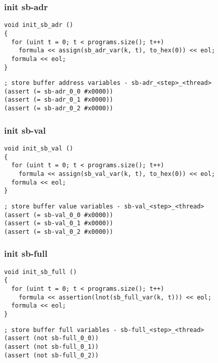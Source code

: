 \subsubsection{init sb-adr}

\begin{lstlisting}[style=c++]
void init_sb_adr ()
{
  for (uint t = 0; t < programs.size(); t++)
    formula << assign(sb_adr_var(k, t), to_hex(0)) << eol;
  formula << eol;
}
\end{lstlisting}

\begin{lstlisting}[language=SMTLib]
; store buffer address variables - sb-adr_<step>_<thread>
(assert (= sb-adr_0_0 #x0000))
(assert (= sb-adr_0_1 #x0000))
(assert (= sb-adr_0_2 #x0000))
\end{lstlisting}

\subsubsection{init sb-val}

\begin{lstlisting}[style=c++]
void init_sb_val ()
{
  for (uint t = 0; t < programs.size(); t++)
    formula << assign(sb_val_var(k, t), to_hex(0)) << eol;
  formula << eol;
}
\end{lstlisting}

\begin{lstlisting}[language=SMTLib]
; store buffer value variables - sb-val_<step>_<thread>
(assert (= sb-val_0_0 #x0000))
(assert (= sb-val_0_1 #x0000))
(assert (= sb-val_0_2 #x0000))
\end{lstlisting}

\subsubsection{init sb-full}

\begin{lstlisting}[style=c++]
void init_sb_full ()
{
  for (uint t = 0; t < programs.size(); t++)
    formula << assertion(lnot(sb_full_var(k, t))) << eol;
  formula << eol;
}
\end{lstlisting}

\begin{lstlisting}[language=SMTLib]
; store buffer full variables - sb-full_<step>_<thread>
(assert (not sb-full_0_0))
(assert (not sb-full_0_1))
(assert (not sb-full_0_2))
\end{lstlisting}

